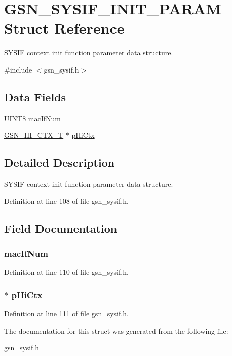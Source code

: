\hypertarget{a00262}{
\section{GSN\_\-SYSIF\_\-INIT\_\-PARAM Struct Reference}
\label{a00262}
}


SYSIF context init function parameter data structure.  




{\ttfamily \#include $<$gsn\_\-sysif.h$>$}

\subsection*{Data Fields}
\begin{DoxyCompactItemize}
\item 
\hyperlink{a00660_gab27e9918b538ce9d8ca692479b375b6a}{UINT8} \hyperlink{a00262_ae57ae92e651751e7978e237c55133b4c}{macIfNum}
\item 
\hyperlink{a00085}{GSN\_\-HI\_\-CTX\_\-T} $\ast$ \hyperlink{a00262_ab671e23204d79f8fda7dba9992c3d6e9}{pHiCtx}
\end{DoxyCompactItemize}


\subsection{Detailed Description}
SYSIF context init function parameter data structure. 

Definition at line 108 of file gsn\_\-sysif.h.



\subsection{Field Documentation}
\hypertarget{a00262_ae57ae92e651751e7978e237c55133b4c}{
\subsubsection[{macIfNum}]{ {\bf macIfNum}}}
\label{a00262_ae57ae92e651751e7978e237c55133b4c}


Definition at line 110 of file gsn\_\-sysif.h.

\hypertarget{a00262_ab671e23204d79f8fda7dba9992c3d6e9}{
\subsubsection[{pHiCtx}]{$\ast$ {\bf pHiCtx}}}
\label{a00262_ab671e23204d79f8fda7dba9992c3d6e9}


Definition at line 111 of file gsn\_\-sysif.h.



The documentation for this struct was generated from the following file:\begin{DoxyCompactItemize}
\item 
\hyperlink{a00596}{gsn\_\-sysif.h}\end{DoxyCompactItemize}
